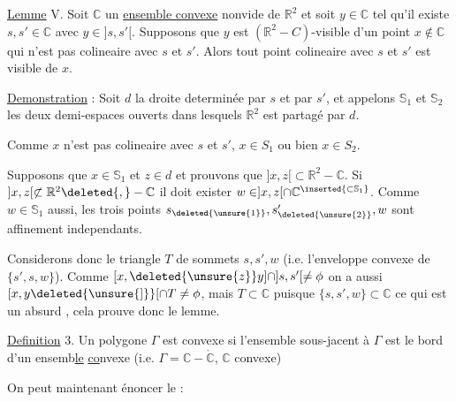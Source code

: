 \deleted{$]z,x]\subset\mathbb{R}^{2}-\mathbb{C}$, c.q.f.d.}

\uline{Lemme} V. Soit $\mathbb{C}$ un \uline{ensemble convexe} nonvide de $\mathbb{R}^{2}$ et soit $y\in\mathbb{C}$ tel qu'il existe $s,s'\in\mathbb{C}$ avec $y\in ]s,s'[$. Supposons que $y$ est $(\mathbb{R}^{2}-C)$-visible d'un point $x\notin\mathbb{C}$ qui n'est pas colineaire avec $s$ et $s'$. Alors tout point colineaire avec $s$ et $s'$ est visible de $x$.


\uline{Demonstration} : Soit $d$ la droite determinée par $s$ et par $s'$, et appelons $\mathbb{S}_{1}$ et $\mathbb{S}_{2}$ les deux demi-espaces ouverts dans lesquels $\mathbb{R}^{2}$ est partagé par $d$.

Comme $x$ n'est pas colineaire avec $s$ et $s'$,  $x\in S_{1}$ ou bien $x\in S_{2}$.

Supposons que $x\in\mathbb{S}_{1}$ et $z\in d$ et prouvons que $]x,z[\subset\mathbb{R}^{2}-\mathbb{C}$. Si $]x,z[\not\subset\mathbb{R}^{2}\deleted{,}-\mathbb{C}$ il doit exister $w\in ]x,z[\cap\mathbb{C}{}^{\inserted{\subset\mathbb{S}_{1}}}$. Comme $w\in\mathbb{S}_{1}$ aussi, les trois points $s_{\deleted{\unsure{1}}},s_{\deleted{\unsure{2}}}',w$ sont affinement independants.

Considerons donc le triangle $T$ de sommets $s,s',w$ (i.e. l'enveloppe convexe de $\{s',s,w\}$). Comme $[x,\deleted{\unsure{z}}y]\cap ]s,s'[\ne\phi$ on a aussi $[x,y\deleted{\unsure{]}}[\cap T\ne\phi$, mais $T\subset\mathbb{C}$ puisque $\{s,s',w\}\subset\mathbb{C}$ ce qui est un absurd \inserted{puisque on suppose $[x,y[\cap\mathbb{C}=\phi$}, cela prouve donc le lemme.

\uline{Definition} 3. Un polygone $\Gamma$ est  convexe  si l'ensemble sous-jacent à $\Gamma$ est le bord d'un ensemb\uline{le} \uline{co}nvexe (i.e. $\Gamma=\mathbb{C}-\mathring{\mathbb{C}}$, $\mathbb{C}$ convexe)

\margin{$\bullet$}
On peut maintenant énoncer le :

